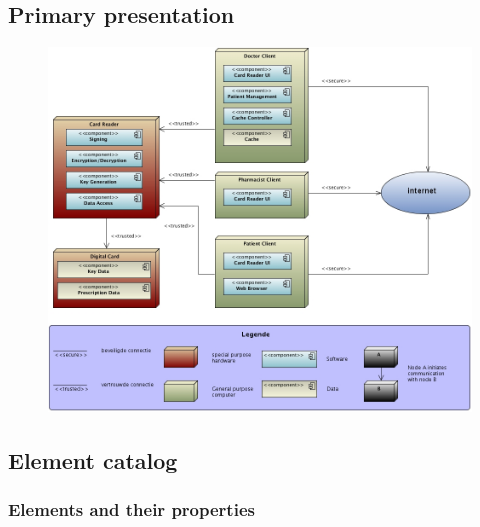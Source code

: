 \documentclass[a4paper,10pt]{paper}
\begin{document}
\subsection{Primary presentation}
\begin{center}
    \begin{figure}
      \includegraphics[width=\textwidth]{../images/deployment_clients.jpg}
    \end{figure}
  \end{center}

\subsection{Element catalog}

\subsubsection{Elements and their properties}
\end{document}
